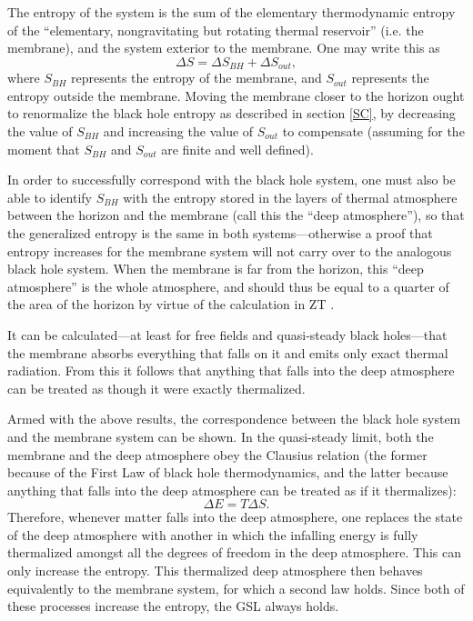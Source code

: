 \documentclass[12pt]{article}
\begin{document}
The entropy of the system is the sum of the elementary thermodynamic entropy of the ``elementary, nongravitating but rotating thermal reservoir'' (i.e. the membrane), and the system exterior to the membrane.  One may write this as
\begin{equation}\label{sep}
\Delta S = \Delta S_{BH} + \Delta S_{out},
\end{equation}
where $S_{BH}$ represents the entropy of the membrane, and $S_{out}$ represents the entropy outside the membrane.  Moving the membrane closer to the horizon ought to renormalize the black hole entropy as described in section \ref{SC}, by decreasing the value of $S_{BH}$ and increasing the value of $S_{out}$ to compensate (assuming for the moment that $S_{BH}$ and $S_{out}$ are finite and well defined).

In order to successfully correspond with the black hole system, one must also be able to identify $S_{BH}$ with the entropy stored in the layers of thermal atmosphere between the horizon and the membrane (call this the ``deep atmosphere''), so that the generalized entropy is the same in both systems---otherwise a proof that entropy increases for the membrane system will not carry over to the analogous black hole system.  When the membrane is far from the horizon, this ``deep atmosphere'' is the whole atmosphere, and should thus be equal to a quarter of the area of the horizon by virtue of the calculation in ZT \cite{ZT85}.

It can be calculated---at least for free fields and quasi-steady black holes---that the membrane absorbs everything that falls on it and emits only exact thermal radiation.  From this it follows that anything that falls into the deep atmosphere can be treated as though it were exactly thermalized.

Armed with the above results, the correspondence between the black hole system and the membrane system can be shown.  In the quasi-steady limit, both the membrane and the deep atmosphere obey the Clausius relation (the former because of the First Law of black hole thermodynamics, and the latter because anything that falls into the deep atmosphere can be treated as if it thermalizes):
\begin{equation}
\Delta E = T \Delta S.
\end{equation}
Therefore, whenever matter falls into the deep atmosphere, one replaces the state of the deep atmosphere with another in which the infalling energy is fully thermalized amongst all the degrees of freedom in the deep atmosphere.  This can only increase the entropy.  This thermalized deep atmosphere then behaves equivalently to the membrane system, for which a second law holds.  Since both of these processes increase the entropy, the GSL always holds.
\end{document}

